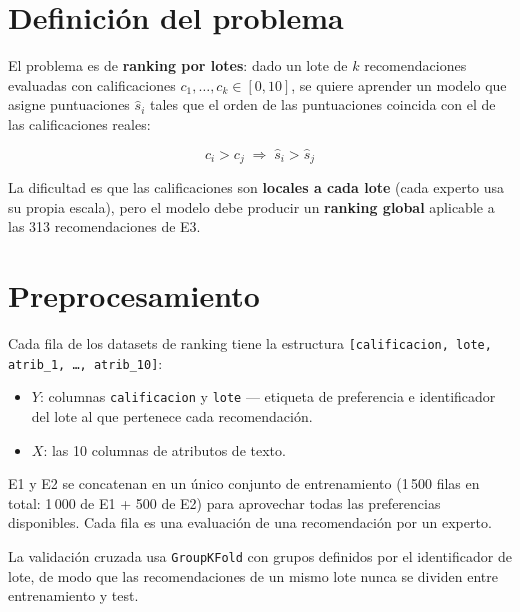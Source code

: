 \documentclass[11pt,a4paper]{article}
\begin{document}
\section{Definición del problema}

El problema es de \textbf{ranking por lotes}: dado un lote de $k$
recomendaciones evaluadas con calificaciones $c_1, \ldots, c_k \in [0,10]$,
se quiere aprender un modelo que asigne puntuaciones $\hat{s}_i$ tales que
el orden de las puntuaciones coincida con el de las calificaciones reales:

\begin{equation}
    c_i > c_j \;\Rightarrow\; \hat{s}_i > \hat{s}_j
\end{equation}

La dificultad es que las calificaciones son \textbf{locales a cada lote}
(cada experto usa su propia escala), pero el modelo debe producir un
\textbf{ranking global} aplicable a las 313 recomendaciones de E3.


\section{Preprocesamiento}

Cada fila de los datasets de ranking tiene la estructura
\texttt{[calificacion, lote, atrib\_1, \ldots, atrib\_10]}:

\begin{itemize}
    \item $Y$: columnas \texttt{calificacion} y \texttt{lote} — etiqueta de
    preferencia e identificador del lote al que pertenece cada recomendación.
    \item $X$: las 10 columnas de atributos de texto.
\end{itemize}

E1 y E2 se concatenan en un único conjunto de entrenamiento (1\,500 filas
en total: 1\,000 de E1 + 500 de E2) para aprovechar todas las preferencias
disponibles. Cada fila es una evaluación de una recomendación por un experto.

La validación cruzada usa \texttt{GroupKFold} con grupos definidos por el
identificador de lote, de modo que las recomendaciones de un mismo lote
nunca se dividen entre entrenamiento y test.
\end{document}
